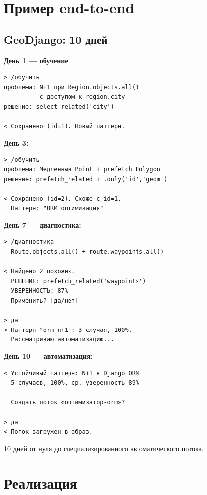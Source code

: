 \documentclass[10pt, oneside]{article}
\begin{document}
\section{Пример end-to-end}

\subsection{GeoDjango: 10 дней}

\textbf{День 1 --- обучение:}
\begin{lstlisting}[language={},numbers=none]
> /обучить
проблема: N+1 при Region.objects.all()
          с доступом к region.city
решение: select_related('city')

< Сохранено (id=1). Новый паттерн.
\end{lstlisting}

\textbf{День 3:}
\begin{lstlisting}[language={},numbers=none]
> /обучить
проблема: Медленный Point + prefetch Polygon
решение: prefetch_related + .only('id','geom')

< Сохранено (id=2). Схоже с id=1.
  Паттерн: "ORM оптимизация"
\end{lstlisting}

\textbf{День 7 --- диагностика:}
\begin{lstlisting}[language={},numbers=none]
> /диагностика
  Route.objects.all() + route.waypoints.all()

< Найдено 2 похожих.
  РЕШЕНИЕ: prefetch_related('waypoints')
  УВЕРЕННОСТЬ: 87%
  Применить? [да/нет]

> да
< Паттерн "orm-n+1": 3 случая, 100%.
  Рассматриваю автоматизацию...
\end{lstlisting}

\textbf{День 10 --- автоматизация:}
\begin{lstlisting}[language={},numbers=none]
< Устойчивый паттерн: N+1 в Django ORM
  5 случаев, 100%, ср. уверенность 89%

  Создать поток «оптимизатор-orm»?

> да
< Поток загружен в образ.
\end{lstlisting}

\begin{successbox}[title={Итог}]
10 дней от нуля до специализированного
автоматического потока.
\end{successbox}

\section{Реализация}
\end{document}

